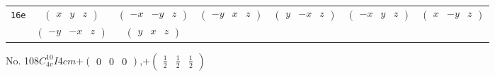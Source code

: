 \documentclass[fleqn,9pt,landscape]{jsarticle}
\begin{document}
\begin{center}
\begin{longtable}{ccccccc}
{\tt 16e} & $ \begin{pmatrix} x & y & z \end{pmatrix} $ & $ \begin{pmatrix} - x & - y & z \end{pmatrix} $ & $ \begin{pmatrix} - y & x & z \end{pmatrix} $ & $ \begin{pmatrix} y & - x & z \end{pmatrix} $ & $ \begin{pmatrix} - x & y & z \end{pmatrix} $ & $ \begin{pmatrix} x & - y & z \end{pmatrix} $ \\
& $ \begin{pmatrix} - y & - x & z \end{pmatrix} $ & $ \begin{pmatrix} y & x & z \end{pmatrix} $ & $  $ & $  $ & $  $ & $  $ \\
\end{longtable}
\end{center}
\newpage
No. 108\quad$C_{4v}^{10}$\quad$I4cm$\quad[ tetragonal ]\quad$+\begin{pmatrix} 0 & 0 & 0 \end{pmatrix}$,\quad $+\begin{pmatrix} \frac{1}{2} & \frac{1}{2} & \frac{1}{2} \end{pmatrix}$
\end{document}
